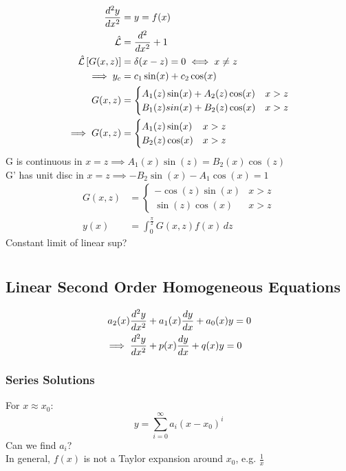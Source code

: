 \documentclass[Maths.tex]{subfiles}
\begin{document}
\begin{example}
\begin{align}
    \frac{d^2 y}{dx^2} &= y = f(x) \\
    \hat{\mathcal{L}} &= \frac{d^2}{dx^2} + 1 \\
    \hat{\mathcal{L}}\left[G(x,z)\right] &= \delta(x-z) = 0 \iff x \neq z \\
    \implies y_c &= c_1\sin(x) +c_2\cos(x) \\
    G(x,z) &= \begin{cases} A_1(z)\sin(x) + A_2(z)\cos(x) & x > z \\ B_1(z)sin(x) + B_2(z)\cos(x) & x > z \end{cases} \\
    \implies G(x,z) &= \begin{cases} A_1(z)\sin(x) & x > z \\ B_2(z)\cos(x) & x > z \end{cases}
\end{align}
G is continuous in $x = z \implies A_1(x)\sin(z) = B_2(x)\cos(z)$ \\
G' has unit disc in $x = z \implies -B_2\sin(x) - A_1\cos(x) = 1$
\begin{align}
    G(x,z) &= \begin{cases} -\cos(z)\sin(x) & x > z \\ \sin(z)\cos(x) & x > z \end{cases} \\
    y(x) &= \int_0^{\frac{\pi}{2}} G(x,z)f(x)\,dz
\end{align}
Constant limit of linear sup?
\end{example}

\chapter{}
\section{Linear Second Order Homogeneous Equations}
\begin{align}
    a_2(x)\frac{d^2 y}{dx^2} &+ a_1(x)\frac{dy}{dx} + a_0(x)y = 0 \\
    \implies \frac{d^2 y}{dx^2} &+ p(x)\frac{dy}{dx} + q(x)y = 0
\end{align}

\subsection{Series Solutions}
For $x \approx x_0:$
\begin{equation}
    y = \sum_{i=0}^\infty a_i(x-x_0)^i
\end{equation}
Can we find $a_i$? \\
In general, $f(x)$ is not a Taylor expansion around $x_0$, e.g. $\frac{1}{x}$
\end{document}
